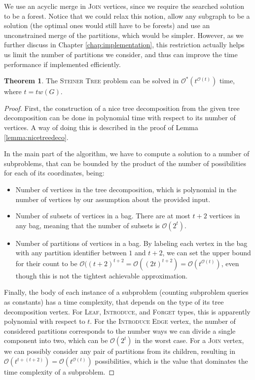 \documentclass[thesis=M,english,hidelinks]{FITthesis}[2012/10/20]
\theoremstyle{definition}
\newtheorem{theorem}{Theorem}
\begin{document}
We use an acyclic merge in \textsc{Join} vertices, since we require the searched solution to be a forest. Notice that we
could relax this notion, allow any subgraph to be a solution (the optimal ones would still have to be forests) and use
an unconstrained merge of the partitions, which would be simpler. However, as we further discuss in Chapter
\ref{chap:implementation}, this restriction actually helps us limit the number of partitions we consider, and thus can
improve the time performance if implemented efficiently.

\begin{theorem}
    The \textsc{Steiner Tree} problem can be solved in $\mathcal{O}^*(t^{\mathcal{O}(t)})$ time, where $t = tw(G)$.
\end{theorem}

\begin{proof}
    First, the construction of a nice tree decomposition from the given tree decomposition can be done in polynomial
    time with respect to its number of vertices. A way of doing this is described in the proof of Lemma
    \ref{lemma:nicetreedeco}.

    In the main part of the algorithm, we have to compute a solution to a number of subproblems, that can be bounded by the
    product of the number of possibilities for each of its coordinates, being:

    \begin{itemize}
        \item Number of vertices in the tree decomposition, which is polynomial in the number of vertices by our
            assumption about the provided input.
        \item Number of subsets of vertices in a bag. There are at most $t + 2$ vertices in any bag, meaning that
            the number of subsets is $\mathcal{O}(2^t)$.
        \item Number of partitions of vertices in a bag. By labeling each vertex in the bag with any partition identifier
            between $1$ and $t + 2$, we can set the upper bound for their count to be $\mathcal{O}((t+2)^{t+2} =
            \mathcal{O}((2t)^{t+2}) = \mathcal{O}(t^{\mathcal{O}(t)})$, even though this is not the tightest achievable
            approximation.
    \end{itemize}

    Finally, the body of each instance of a subproblem (counting subproblem queries as constants) has a time complexity,
    that depends on the type of its tree decomposition vertex. For \textsc{Leaf}, \textsc{Introduce}, and
    \textsc{Forget} types, this is apparently polynomial with respect to $t$. For the \textsc{Introduce Edge} vertex,
    the number of considered partitions corresponds to the number ways we can divide a single component into two, which
    can be $\mathcal{O}(2^t)$ in the worst case. For a \textsc{Join} vertex, we can possibly consider any pair of
    partitions from its children, resulting in $\mathcal{O}(t^{t + (t+2)}) = \mathcal{O}(t^{\mathcal{O}(t)})$
    possibilities, which is the value that dominates the time complexity of a subproblem.


\end{proof}
\end{document}
